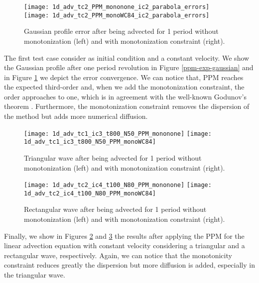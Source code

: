 \begin{figure}[ht]
	\centering
	\texttt{[image: 1d\_adv\_tc2\_PPM\_mononone\_ic2\_parabola\_errors]}
	\texttt{[image: 1d\_adv\_tc2\_PPM\_monoWC84\_ic2\_parabola\_errors]}
	\caption{Gaussian profile error after being advected for 1 period without monotonization (left) and
	with monotonization constraint (right).}
	\label{ppm-exp-gaussian-errors}
\end{figure}

The first test case consider as initial condition and a constant velocity.
We show the Gaussian profile after one period revolution in Figure \ref{ppm-exp-gaussian}
and in Figure \ref{ppm-exp-gaussian-errors} we depict the error convergence.
We can notice that, PPM reaches the expected third-order and, when we add the monotonization constraint,
the order approaches to one, which is in agreement with the well-known Godunov's theorem \citet{leveque:2002}.
Furthermore, the monotonization constraint removes the dispersion of the method
but adds more numerical diffusion.

\begin{figure}[ht]
	\centering
	\texttt{[image: 1d\_adv\_tc1\_ic3\_t800\_N50\_PPM\_mononone]}
	\texttt{[image: 1d\_adv\_tc1\_ic3\_t800\_N50\_PPM\_monoWC84]}
	\caption{Triangular wave after being advected for 1 period without monotonization (left) and
	with monotonization constraint (right).}
	\label{ppm-exp-triangular}
\end{figure}

\begin{figure}[ht]
	\centering
	\texttt{[image: 1d\_adv\_tc2\_ic4\_t100\_N80\_PPM\_mononone]}
	\texttt{[image: 1d\_adv\_tc2\_ic4\_t100\_N80\_PPM\_monoWC84]}
	\caption{Rectangular wave after being advected for 1 period without monotonization (left) and
	with monotonization constraint (right).}
	\label{ppm-exp-rectangular}
\end{figure}

Finally, we show in Figures \ref{ppm-exp-triangular} and \ref{ppm-exp-rectangular}
the results after applying the PPM for the linear advection equation with
constant velocity considering a triangular and a rectangular wave, respectively.
Again, we can notice that the monotonicity constraint reduces greatly the 
dispersion but more diffusion is added, especially in the triangular wave.

